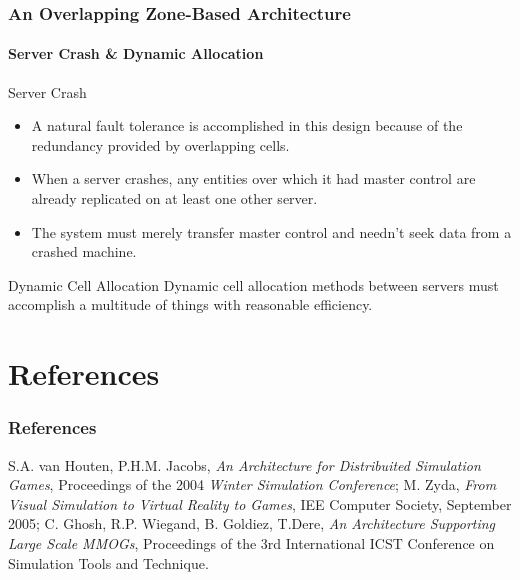 \begin{frame}[fragile]
\frametitle{An Overlapping Zone-Based Architecture}
\framesubtitle{Server Crash \& Dynamic Allocation}
\begin{block}{Server Crash}
\begin{itemize}
\item %
A natural fault tolerance is accomplished in this design because
of the redundancy provided by overlapping cells.
\item %
When a server crashes, any entities over which it had master control are
already replicated on at least one other server.
\item %
The system must merely transfer master control and needn't seek data from a
crashed machine.
\end{itemize}
\end{block}
\pause
\begin{block}{Dynamic Cell Allocation}%
Dynamic cell allocation methods between servers must
accomplish a multitude of things with reasonable efficiency.
\end{block}
\end{frame}

\section*{References}
\begin{frame}
\frametitle{References}
\begin{thebibliography}{}
 S.A. van Houten, P.H.M. Jacobs, \emph{An Architecture for
Distribuited Simulation Games},
Proceedings of the 2004 \emph{Winter Simulation Conference};
 M. Zyda, \emph{From Visual Simulation to Virtual Reality to
Games}, IEE Computer Society, September 2005;
 C. Ghosh, R.P. Wiegand, B. Goldiez, T.Dere, \emph{An
Architecture Supporting Large Scale MMOGs},
Proceedings of the 3rd International ICST Conference on Simulation Tools
and Technique.
\end{thebibliography}
\end{frame}
